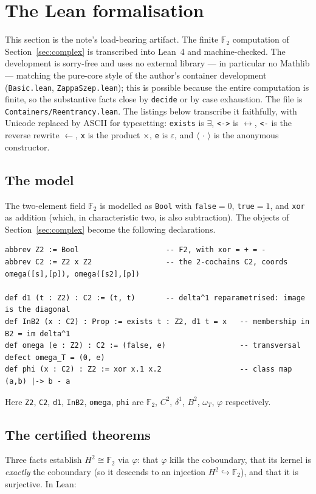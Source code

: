 \documentclass[11pt]{amsart}
\theoremstyle{definition}
\theoremstyle{remark}
\newcommand{\FF}{\mathbb{F}_2}
\begin{document}
\section{The Lean formalisation}\label{sec:lean}

This section is the note's load-bearing artifact. The finite $\FF$ computation of
Section~\ref{sec:complex} is transcribed into Lean~4 and machine-checked. The development is
sorry-free and uses no external library --- in particular no Mathlib --- matching the pure-core style
of the author's container development (\texttt{Basic.lean}, \texttt{ZappaSzep.lean}); this is possible
because the entire computation is finite, so the substantive facts close by \texttt{decide} or by case
exhaustion. The file is \texttt{Containers/Reentrancy.lean}. The listings below transcribe it faithfully, with
Unicode replaced by ASCII for typesetting: \texttt{exists} is $\exists$, \texttt{<->} is
$\leftrightarrow$, \texttt{<-} is the reverse rewrite $\leftarrow$, \texttt{x} is the product
$\times$, \texttt{e} is $\varepsilon$, and $\langle\,\cdot\,\rangle$ is the anonymous constructor.

\subsection*{The model}
The two-element field $\FF$ is modelled as \texttt{Bool} with \texttt{false}${}=0$,
\texttt{true}${}=1$, and \texttt{xor} as addition (which, in characteristic two, is also subtraction).
The objects of Section~\ref{sec:complex} become the following declarations.

\begin{lstlisting}[style=lean]
abbrev Z2 := Bool                    -- F2, with xor = + = -
abbrev C2 := Z2 x Z2                 -- the 2-cochains C2, coords omega([s],[p]), omega([s2],[p])

def d1 (t : Z2) : C2 := (t, t)       -- delta^1 reparametrised: image is the diagonal
def InB2 (x : C2) : Prop := exists t : Z2, d1 t = x   -- membership in B2 = im delta^1
def omega (e : Z2) : C2 := (false, e)                 -- transversal defect omega_T = (0, e)
def phi (x : C2) : Z2 := xor x.1 x.2                  -- class map (a,b) |-> b - a
\end{lstlisting}

\noindent Here \texttt{Z2}, \texttt{C2}, \texttt{d1}, \texttt{InB2}, \texttt{omega}, \texttt{phi} are
$\FF$, $C^2$, $\delta^1$, $B^2$, $\omega_T$, $\varphi$ respectively.

\subsection*{The certified theorems}
Three facts establish $H^2\cong\FF$ via $\varphi$: that $\varphi$ kills the coboundary, that its kernel
is \emph{exactly} the coboundary (so it descends to an injection $H^2\hookrightarrow\FF$), and that it
is surjective. In Lean:
\end{document}
